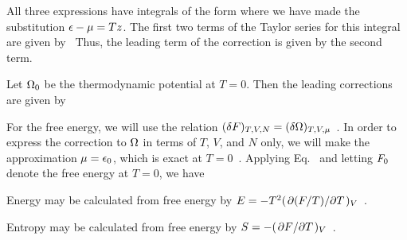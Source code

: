 \documentclass[11pt]{article}
\begin{document}
{	All three expressions have integrals of the form
	where we have made the substitution $\epsilon - \mu = T z$.  The first two terms of the Taylor series for this integral are given by~\cite[p.~155]{Landau}
	Thus, the leading term of the correction is given by the second term.
	
	Let $\Omega_0$ be the thermodynamic potential at $T = 0$.  Then the leading corrections are given by
	
	For the free energy, we will use the relation $(\delta F)_{T, V, N} = (\delta \Omega)_{T, V, \mu}$~\cite[pp.~69, 156]{Landau}.  In order to express the correction to $\Omega$ in terms of $T$, $V$, and $N$ only, we will make the approximation $\mu = \epsilon_0$, which is exact at $T = 0$~\cite[p.~153]{Landau}.  Applying Eq.~ and letting $F_0$ denote the free energy at $T = 0$, we have
	
	Energy may be calculated from free energy by $E = -T^2 (\pdv*{(F/T)}{T})_{V}$~\cite[p.~47]{Landau}.
	
	Entropy may be calculated from free energy by $S = -(\pdv*{F}{T})_{V}$~\cite[p.~46]{Landau}.  
}
\end{document}
